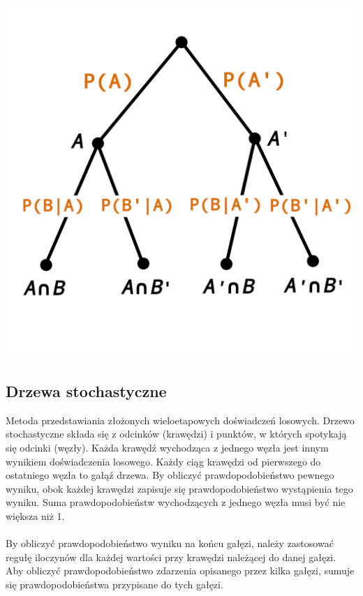 \documentclass[14pt,a4paper]{extarticle}
\begin{document}
\begin{center}
   \includegraphics[scale=1.4]{drzewo stochastyczne.png}
\end{center}
\noindent
\subsection{Drzewa stochastyczne}
Metoda przedstawiania złożonych wieloetapowych doświadczeń losowych. Drzewo stochastyczne składa się
z odcinków (krawędzi) i punktów, w których spotykają się odcinki (węzły). Każda krawędź wychodząca
z jednego węzła jest innym wynikiem doświadczenia losowego. Każdy ciąg krawędzi od pierwszego do
ostatniego węzła to gałąź drzewa. By obliczyć prawdopodobieństwo pewnego wyniku, obok każdej krawędzi
zapisuje się prawdopodobieństwo wystąpienia tego wyniku. Suma prawdopodobieństw wychodzących z 
jednego węzła musi być nie większa niż 1.\\\\

\noindent By obliczyć prawdopodobieństwo wyniku na końcu gałęzi, należy zastosować regułę iloczynów dla
każdej wartości przy krawędzi należącej do danej gałęzi.\\
Aby obliczyć prawdopodobieństwo zdarzenia opisanego przez kilka gałęzi, sumuje się prawdopodobieństwa
przypisane do tych gałęzi.
\end{document}
